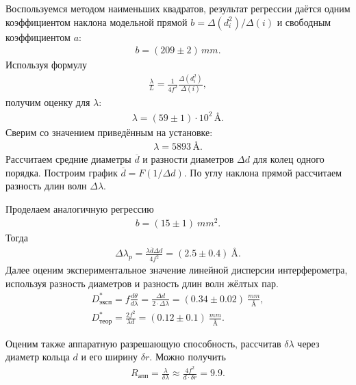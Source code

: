 \begin{enumerate}
    Воспользуемся методом наименьших квадратов, результат регрессии даётся одним коэффициентом наклона модельной прямой $b = \Delta(d_i^2) / \Delta(i)$ и свободным коэффициентом $a$:
    \begin{gather*}
        b = (209 \pm 2) \, mm.
    \end{gather*}
    Используя формулу
    \begin{gather*}
        \frac{\lambda}{L} = \frac{1}{4 f^2}\frac{\Delta(d_i^2)}{\Delta(i)}, 
    \end{gather*}
    получим оценку для $\lambda$:
    \begin{gather*}
        \lambda = (59 \pm 1) \cdot 10^2 \, \text{\AA}.
    \end{gather*}
    Сверим со значением приведённым на установке:
    \begin{gather*}
        \lambda = 5893 \, \text{\AA}.
    \end{gather*}
    Рассчитаем средние диаметры $\overline{d}$ и разности диаметров $\Delta d$ для колец одного порядка. Построим график $\overline{d} = F(1 / \Delta d)$. По углу наклона прямой рассчитаем разность длин волн $\Delta \lambda$.
    \begin{figure}[h]
    \end{figure}
    Проделаем аналогичную регрессию 
    \begin{gather*}
        b = (15 \pm 1)~mm^2.
    \end{gather*}
    Тогда
    \begin{gather*}
        \Delta \lambda_p = \frac{\lambda \overline{d} \Delta d}{4 f^2} = (2.5 \pm 0.4)~\text{\AA}.
    \end{gather*}
    Далее оценим экспериментальное значение линейной дисперсии интерферометра, используя разность диаметров и разность длин волн жёлтых пар.
    \begin{gather*}
        D^*_{\text{эксп}} = f\frac{d\theta}{d\lambda} = \frac{\Delta d}{2 \cdot \Delta \lambda} = (0.34 \pm 0.02)~\frac{mm}{\text{\AA}},\\
        D^*_{\text{теор}} = \frac{2 f^2}{\lambda d} = (0.12 \pm 0.1)~\frac{mm}{\text{\AA}}.
    \end{gather*}
    
    Оценим также аппаратную разрешающую способность, рассчитав $\delta \lambda$ через диаметр кольца $d$ и его ширину $\delta r$. Можно получить
    \begin{gather*}
        R_{\text{апп}} = \frac{\lambda}{\delta \lambda} \approx \frac{4 f^2}{d \cdot \delta r} = 9.9.
    \end{gather*}
    

\end{enumerate}

